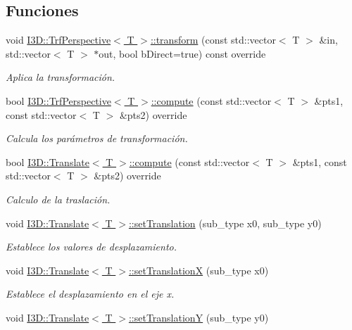 \subsection*{Funciones}
\begin{DoxyCompactItemize}
\item 
void \hyperlink{group__trf2_d_group_ga0742db3f66df991a7e4a2d1d91d1a783}{I3\+D\+::\+Trf\+Perspective$<$ T $>$\+::transform} (const std\+::vector$<$ T $>$ \&in, std\+::vector$<$ T $>$ $\ast$out, bool b\+Direct=true) const  override
\begin{DoxyCompactList}\small\item\em Aplica la transformación. \end{DoxyCompactList}\item 
bool \hyperlink{group__trf2_d_group_gaf4d7f0809edd08cc847f3df1db43055e}{I3\+D\+::\+Trf\+Perspective$<$ T $>$\+::compute} (const std\+::vector$<$ T $>$ \&pts1, const std\+::vector$<$ T $>$ \&pts2) override
\begin{DoxyCompactList}\small\item\em Calcula los parámetros de transformación. \end{DoxyCompactList}\item 
bool \hyperlink{group__trf2_d_group_ga8cab577e50c525caed001caec42a70a6}{I3\+D\+::\+Translate$<$ T $>$\+::compute} (const std\+::vector$<$ T $>$ \&pts1, const std\+::vector$<$ T $>$ \&pts2) override
\begin{DoxyCompactList}\small\item\em Calculo de la traslación. \end{DoxyCompactList}\item 
void \hyperlink{group__trf2_d_group_ga93831181f6cf779c0a7097b348c9c879}{I3\+D\+::\+Translate$<$ T $>$\+::set\+Translation} (sub\+\_\+type x0, sub\+\_\+type y0)
\begin{DoxyCompactList}\small\item\em Establece los valores de desplazamiento. \end{DoxyCompactList}\item 
void \hyperlink{group__trf2_d_group_gaa4a82205fd57f86aed9338054104a22f}{I3\+D\+::\+Translate$<$ T $>$\+::set\+TranslationX} (sub\+\_\+type x0)
\begin{DoxyCompactList}\small\item\em Establece el desplazamiento en el eje x. \end{DoxyCompactList}\item 
void \hyperlink{group__trf2_d_group_gaed6d19903cf0da2cd1ced22381ec223b}{I3\+D\+::\+Translate$<$ T $>$\+::set\+TranslationY} (sub\+\_\+type y0)

\end{DoxyCompactItemize}
